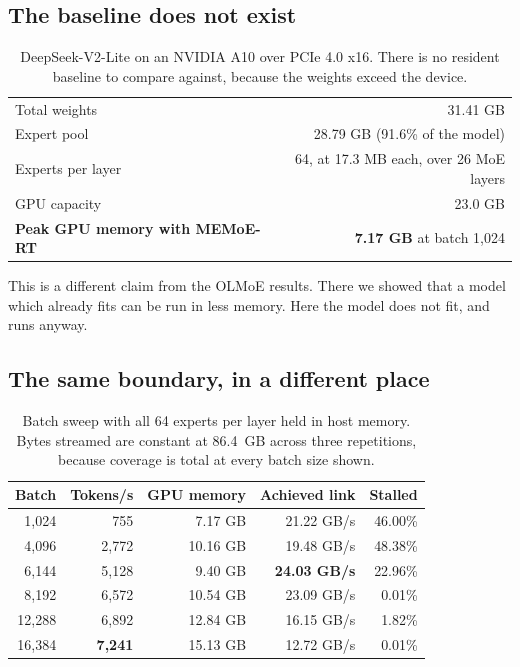 \documentclass[10pt,a4paper]{article}
\begin{document}
\subsection{The baseline does not exist}

\begin{table}[htbp]
\centering\small
\caption{DeepSeek-V2-Lite on an NVIDIA A10 over PCIe 4.0 x16. There is no
resident baseline to compare against, because the weights exceed the device.}
\label{tab:dsfit}
\begin{tabular}{lr}
\toprule
Total weights & 31.41 GB \\
Expert pool & 28.79 GB (91.6\% of the model) \\
Experts per layer & 64, at 17.3 MB each, over 26 MoE layers \\
GPU capacity & 23.0 GB \\
\midrule
\textbf{Peak GPU memory with MEMoE-RT} & \textbf{7.17 GB} at batch 1{,}024 \\
\bottomrule
\end{tabular}
\end{table}

This is a different claim from the OLMoE results. There we showed that a model
which already fits can be run in less memory. Here the model does not fit, and
runs anyway.

\subsection{The same boundary, in a different place}

\begin{table}[htbp]
\centering\small
\caption{Batch sweep with all 64 experts per layer held in host memory. Bytes
streamed are constant at 86.4~GB across three repetitions, because coverage is
total at every batch size shown.}
\label{tab:dsbatch}
\begin{tabular}{rrrrr}
\toprule
Batch & Tokens/s & GPU memory & Achieved link & Stalled \\
\midrule
1{,}024  &    755 &  7.17 GB & 21.22 GB/s & 46.00\% \\
4{,}096  & 2{,}772 & 10.16 GB & 19.48 GB/s & 48.38\% \\
6{,}144  & 5{,}128 &  9.40 GB & \textbf{24.03 GB/s} & 22.96\% \\
8{,}192  & 6{,}572 & 10.54 GB & 23.09 GB/s &  0.01\% \\
12{,}288 & 6{,}892 & 12.84 GB & 16.15 GB/s &  1.82\% \\
16{,}384 & \textbf{7{,}241} & 15.13 GB & 12.72 GB/s &  0.01\% \\
\bottomrule
\end{tabular}
\end{table}
\end{document}
